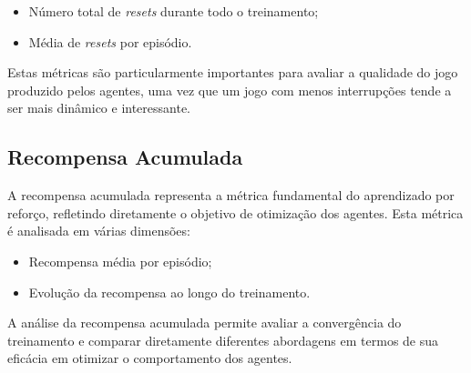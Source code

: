 \begin{itemize}
    \item Número total de \textit{resets} durante todo o treinamento;
    \item Média de \textit{resets} por episódio.
\end{itemize}

Estas métricas são particularmente importantes para avaliar a qualidade do jogo produzido pelos agentes, uma vez que um jogo com menos interrupções tende a ser mais dinâmico e interessante.





\subsection{Recompensa Acumulada}

A recompensa acumulada representa a métrica fundamental do aprendizado por reforço, refletindo diretamente o objetivo de otimização dos agentes. Esta métrica é analisada em várias dimensões:

\begin{itemize}
    \item Recompensa média por episódio;
    \item Evolução da recompensa ao longo do treinamento.
\end{itemize}

A análise da recompensa acumulada permite avaliar a convergência do treinamento e comparar diretamente diferentes abordagens em termos de sua eficácia em otimizar o comportamento dos agentes.


